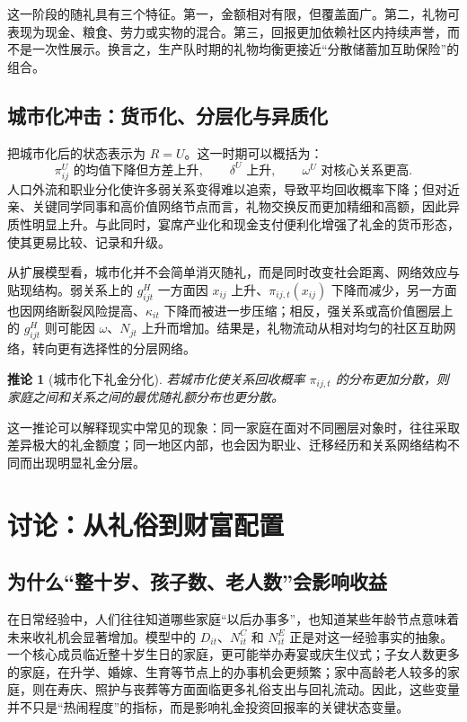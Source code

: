 \documentclass[12pt,a4paper]{ctexart}
\newtheorem{corollary}{推论}
\begin{document}
这一阶段的随礼具有三个特征。第一，金额相对有限，但覆盖面广。第二，礼物可表现为现金、粮食、劳力或实物的混合。第三，回报更加依赖社区内持续声誉，而不是一次性展示。换言之，生产队时期的礼物均衡更接近“分散储蓄加互助保险”的组合。

\subsection{城市化冲击：货币化、分层化与异质化}

把城市化后的状态表示为 $R=U$。这一时期可以概括为：
\[
\pi_{ij}^U \text{ 的均值下降但方差上升}, \qquad
\delta^U \text{ 上升}, \qquad
\omega^U \text{ 对核心关系更高}.
\]
人口外流和职业分化使许多弱关系变得难以追索，导致平均回收概率下降；但对近亲、关键同学同事和高价值网络节点而言，礼物交换反而更加精细和高额，因此异质性明显上升。与此同时，宴席产业化和现金支付便利化增强了礼金的货币形态，使其更易比较、记录和升级。

从扩展模型看，城市化并不会简单消灭随礼，而是同时改变社会距离、网络效应与贴现结构。弱关系上的 $g_{ijt}^{H}$ 一方面因 $x_{ij}$ 上升、$\pi_{ij,t}(x_{ij})$ 下降而减少，另一方面也因网络断裂风险提高、$\kappa_{it}$ 下降而被进一步压缩；相反，强关系或高价值圈层上的 $g_{ijt}^{H}$ 则可能因 $\omega$、$N_{jt}$ 上升而增加。结果是，礼物流动从相对均匀的社区互助网络，转向更有选择性的分层网络。

\begin{corollary}[城市化下礼金分化]
若城市化使关系回收概率 $\pi_{ij,t}$ 的分布更加分散，则家庭之间和关系之间的最优随礼额分布也更分散。
\end{corollary}

这一推论可以解释现实中常见的现象：同一家庭在面对不同圈层对象时，往往采取差异极大的礼金额度；同一地区内部，也会因为职业、迁移经历和关系网络结构不同而出现明显礼金分层。

\section{讨论：从礼俗到财富配置}

\subsection{为什么“整十岁、孩子数、老人数”会影响收益}

在日常经验中，人们往往知道哪些家庭“以后办事多”，也知道某些年龄节点意味着未来收礼机会显著增加。模型中的 $D_{it}$、$N^C_{it}$ 和 $N^E_{it}$ 正是对这一经验事实的抽象。一个核心成员临近整十岁生日的家庭，更可能举办寿宴或庆生仪式；子女人数更多的家庭，在升学、婚嫁、生育等节点上的办事机会更频繁；家中高龄老人较多的家庭，则在寿庆、照护与丧葬等方面面临更多礼俗支出与回礼流动。因此，这些变量并不只是“热闹程度”的指标，而是影响礼金投资回报率的关键状态变量。
\end{document}
